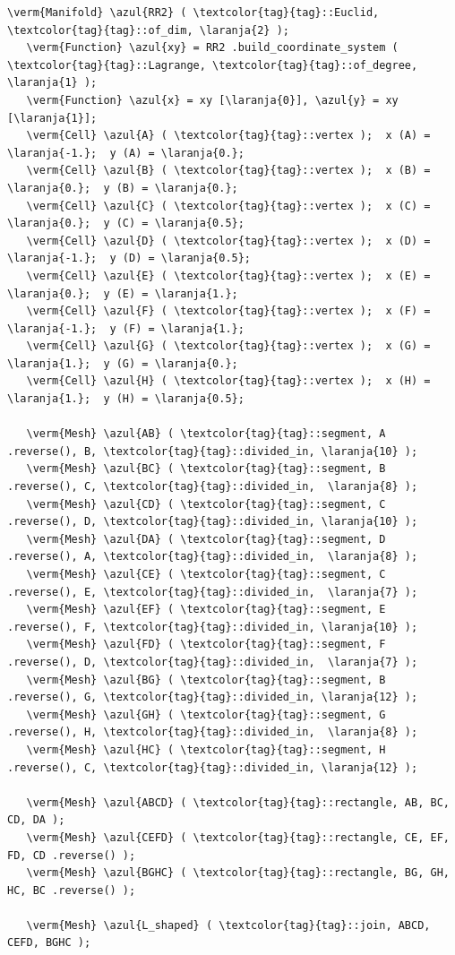 \begin{Verbatim}[commandchars=\\\{\},formatcom=\small\tt,frame=single,
   label=parag-\ref{\numb section 1.\numb parag 4}.cpp,rulecolor=\color{coment},
   baselinestretch=0.94,framesep=2mm]
   \verm{Manifold} \azul{RR2} ( \textcolor{tag}{tag}::Euclid, \textcolor{tag}{tag}::of_dim, \laranja{2} );
   \verm{Function} \azul{xy} = RR2 .build_coordinate_system ( \textcolor{tag}{tag}::Lagrange, \textcolor{tag}{tag}::of_degree, \laranja{1} );
   \verm{Function} \azul{x} = xy [\laranja{0}], \azul{y} = xy [\laranja{1}];
   \verm{Cell} \azul{A} ( \textcolor{tag}{tag}::vertex );  x (A) = \laranja{-1.};  y (A) = \laranja{0.};
   \verm{Cell} \azul{B} ( \textcolor{tag}{tag}::vertex );  x (B) =  \laranja{0.};  y (B) = \laranja{0.};
   \verm{Cell} \azul{C} ( \textcolor{tag}{tag}::vertex );  x (C) =  \laranja{0.};  y (C) = \laranja{0.5};
   \verm{Cell} \azul{D} ( \textcolor{tag}{tag}::vertex );  x (D) = \laranja{-1.};  y (D) = \laranja{0.5};
   \verm{Cell} \azul{E} ( \textcolor{tag}{tag}::vertex );  x (E) =  \laranja{0.};  y (E) = \laranja{1.};
   \verm{Cell} \azul{F} ( \textcolor{tag}{tag}::vertex );  x (F) = \laranja{-1.};  y (F) = \laranja{1.};
   \verm{Cell} \azul{G} ( \textcolor{tag}{tag}::vertex );  x (G) =  \laranja{1.};  y (G) = \laranja{0.};
   \verm{Cell} \azul{H} ( \textcolor{tag}{tag}::vertex );  x (H) =  \laranja{1.};  y (H) = \laranja{0.5};

   \verm{Mesh} \azul{AB} ( \textcolor{tag}{tag}::segment, A .reverse(), B, \textcolor{tag}{tag}::divided_in, \laranja{10} );
   \verm{Mesh} \azul{BC} ( \textcolor{tag}{tag}::segment, B .reverse(), C, \textcolor{tag}{tag}::divided_in,  \laranja{8} );
   \verm{Mesh} \azul{CD} ( \textcolor{tag}{tag}::segment, C .reverse(), D, \textcolor{tag}{tag}::divided_in, \laranja{10} );
   \verm{Mesh} \azul{DA} ( \textcolor{tag}{tag}::segment, D .reverse(), A, \textcolor{tag}{tag}::divided_in,  \laranja{8} );
   \verm{Mesh} \azul{CE} ( \textcolor{tag}{tag}::segment, C .reverse(), E, \textcolor{tag}{tag}::divided_in,  \laranja{7} );
   \verm{Mesh} \azul{EF} ( \textcolor{tag}{tag}::segment, E .reverse(), F, \textcolor{tag}{tag}::divided_in, \laranja{10} );
   \verm{Mesh} \azul{FD} ( \textcolor{tag}{tag}::segment, F .reverse(), D, \textcolor{tag}{tag}::divided_in,  \laranja{7} );
   \verm{Mesh} \azul{BG} ( \textcolor{tag}{tag}::segment, B .reverse(), G, \textcolor{tag}{tag}::divided_in, \laranja{12} );
   \verm{Mesh} \azul{GH} ( \textcolor{tag}{tag}::segment, G .reverse(), H, \textcolor{tag}{tag}::divided_in,  \laranja{8} );
   \verm{Mesh} \azul{HC} ( \textcolor{tag}{tag}::segment, H .reverse(), C, \textcolor{tag}{tag}::divided_in, \laranja{12} );

   \verm{Mesh} \azul{ABCD} ( \textcolor{tag}{tag}::rectangle, AB, BC, CD, DA );
   \verm{Mesh} \azul{CEFD} ( \textcolor{tag}{tag}::rectangle, CE, EF, FD, CD .reverse() );
   \verm{Mesh} \azul{BGHC} ( \textcolor{tag}{tag}::rectangle, BG, GH, HC, BC .reverse() );

   \verm{Mesh} \azul{L_shaped} ( \textcolor{tag}{tag}::join, ABCD, CEFD, BGHC );
\end{Verbatim}

